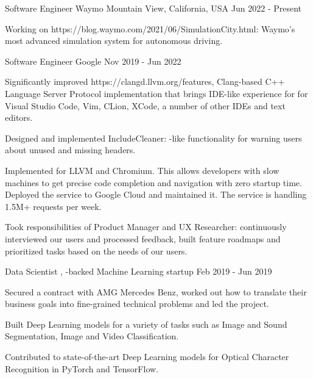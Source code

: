 
\begin{cventries}

  \cventry
    {Software Engineer}
    {Waymo}
    {Mountain View, California, USA}
    {Jun 2022 - Present}
    {
      \begin{cvitems}
        \item Working on 
	{https://blog.waymo.com/2021/06/SimulationCity.html}: Waymo's most
        advanced simulation system for autonomous driving.
      \end{cvitems}
    }

  \cventry
    {Software Engineer}
    {Google}
    {}
    {Nov 2019 - Jun 2022}
    {
      \begin{cvitems}
        \item Significantly improved 
	  {https://clangd.llvm.org/features}, Clang-based C++ Language
	  Server Protocol implementation that brings IDE-like experience for
	  for Visual Studio Code, Vim, CLion, XCode, a number of
	  other IDEs and text editors.
        \item Designed and implemented IncludeCleaner:
          -like functionality
          for warning users about unused and missing headers.
        \item Implemented  for LLVM and Chromium. This
          allows developers with slow machines to get precise code completion
          and navigation with zero startup time. Deployed the service to Google
	  Cloud and maintained it. The service is handling 1.5M+ requests
          per week.
        \item Took responsibilities of Product Manager and UX Researcher:
          continuously interviewed our users and processed feedback, built
          feature roadmaps and prioritized tasks based on the needs of our
          users.
      \end{cvitems}
    }

  \cventry
    {Data Scientist}
    {,
     -backed Machine Learning
     startup}
    {}
    {Feb 2019 - Jun 2019}
    {
      \begin{cvitems}
        \item Secured a contract with AMG Mercedes Benz, worked out how to
          translate their business goals into fine-grained technical problems
          and led the project.
        \item Built Deep Learning models for a variety of tasks such as Image
	  and Sound Segmentation, Image and Video Classification.
        \item Contributed to state-of-the-art Deep Learning models for Optical
          Character Recognition in PyTorch and TensorFlow.
      \end{cvitems}
    }


\end{cventries}
